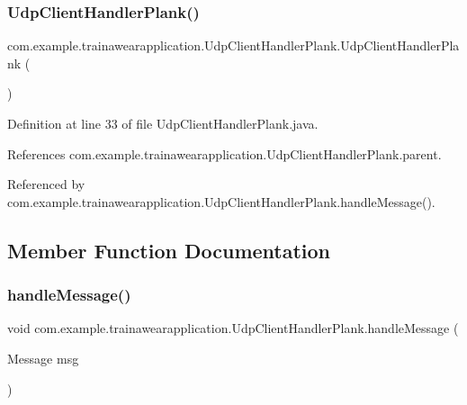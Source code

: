\subsubsection{\texorpdfstring{UdpClientHandlerPlank()}{UdpClientHandlerPlank()}}
{\footnotesize\ttfamily com.\+example.\+trainawearapplication.\+Udp\+Client\+Handler\+Plank.\+Udp\+Client\+Handler\+Plank (\begin{DoxyParamCaption}{ }\end{DoxyParamCaption})}



Definition at line 33 of file Udp\+Client\+Handler\+Plank.\+java.


\begin{DoxyCode}{0}

\end{DoxyCode}


References com.\+example.\+trainawearapplication.\+Udp\+Client\+Handler\+Plank.\+parent.



Referenced by com.\+example.\+trainawearapplication.\+Udp\+Client\+Handler\+Plank.\+handle\+Message().



\subsection{Member Function Documentation}
\mbox{\label{classcom_1_1example_1_1trainawearapplication_1_1_udp_client_handler_plank_a2182425709c67eae734dd1f8dc2e228c}} 
\subsubsection{\texorpdfstring{handleMessage()}{handleMessage()}}
{\footnotesize\ttfamily void com.\+example.\+trainawearapplication.\+Udp\+Client\+Handler\+Plank.\+handle\+Message (\begin{DoxyParamCaption}\item[{Message}]{msg }\end{DoxyParamCaption})}



